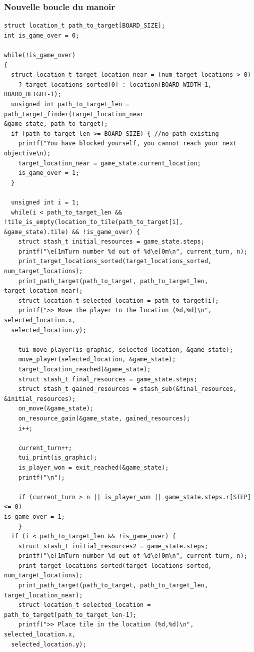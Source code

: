 
\subsubsection*{Nouvelle boucle du manoir}

\begin{verbatim}
struct location_t path_to_target[BOARD_SIZE];
int is_game_over = 0;

while(!is_game_over)
{
  struct location_t target_location_near = (num_target_locations > 0) 
    ? target_locations_sorted[0] : location(BOARD_WIDTH-1, BOARD_HEIGHT-1);
  unsigned int path_to_target_len = path_target_finder(target_location_near
&game_state, path_to_target);
  if (path_to_target_len >= BOARD_SIZE) { //no path existing
    printf("You have blocked yourself, you cannot reach your next objective\n);    
    target_location_near = game_state.current_location;
    is_game_over = 1;
  }
  
  unsigned int i = 1;
  while(i < path_to_target_len && !tile_is_empty(location_to_tile(path_to_target[i], 
&game_state).tile) && !is_game_over) {
    struct stash_t initial_resources = game_state.steps;
    printf("\e[1mTurn number %d out of %d\e[0m\n", current_turn, n);
    print_target_locations_sorted(target_locations_sorted, num_target_locations);
    print_path_target(path_to_target, path_to_target_len, target_location_near);
    struct location_t selected_location = path_to_target[i];
    printf(">> Move the player to the location (%d,%d)\n", selected_location.x, 
  selected_location.y);

    tui_move_player(is_graphic, selected_location, &game_state);
    move_player(selected_location, &game_state);
    target_location_reached(&game_state);
    struct stash_t final_resources = game_state.steps;
    struct stash_t gained_resources = stash_sub(&final_resources, &initial_resources);
    on_move(&game_state);
    on_resource_gain(&game_state, gained_resources);
    i++;

    current_turn++;
    tui_print(is_graphic);
    is_player_won = exit_reached(&game_state);
    printf("\n");

    if (current_turn > n || is_player_won || game_state.steps.r[STEP] <= 0) 
is_game_over = 1;
    }
  if (i < path_to_target_len && !is_game_over) {
    struct stash_t initial_resources2 = game_state.steps;
    printf("\e[1mTurn number %d out of %d\e[0m\n", current_turn, n);
    print_target_locations_sorted(target_locations_sorted, num_target_locations);
    print_path_target(path_to_target, path_to_target_len, target_location_near);
    struct location_t selected_location = path_to_target[path_to_target_len-1];
    printf(">> Place tile in the location (%d,%d)\n", selected_location.x, 
  selected_location.y);
    

\end{verbatim}

